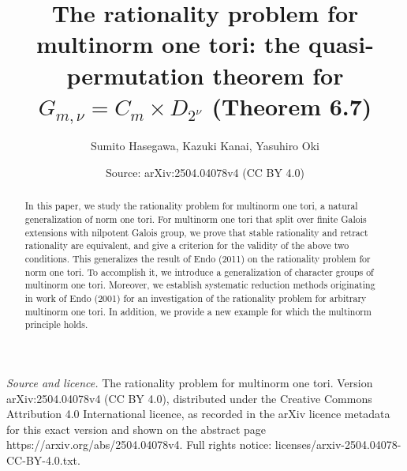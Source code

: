\documentclass[10pt,a4paper]{amsart}
\title[The quasi-permutation theorem for $G_{m,\nu}=C_{m}\times D_{2^{\nu}}$]{The rationality problem for multinorm one tori: the quasi-permutation theorem for $G_{m,\nu}=C_{m}\times D_{2^{\nu}}$ (Theorem 6.7)}
\author{Sumito Hasegawa, Kazuki Kanai, Yasuhiro Oki}
\date{Source: arXiv:2504.04078v4 (CC BY 4.0)}
\begin{document}
\begin{abstract}
In this paper, we study the rationality problem for multinorm one tori, a natural generalization of norm one tori. 
For multinorm one tori that split over finite Galois extensions with nilpotent Galois group, we prove that stable rationality and retract rationality are equivalent, and give a criterion for the validity of the above two conditions. 
This generalizes the result of Endo (2011) on the rationality problem for norm one tori. 
To accomplish it, 
we introduce a generalization of character groups of multinorm one tori.
Moreover, we establish systematic reduction methods originating in work of Endo (2001) for an investigation of the rationality problem for arbitrary multinorm one tori.
In addition, we provide a new example for which the multinorm principle holds.


\end{abstract}
\maketitle

\noindent\emph{Source and licence.} The rationality problem for multinorm one tori. Version arXiv:2504.04078v4 (CC BY 4.0), distributed under the Creative Commons Attribution 4.0 International licence, as recorded in the arXiv licence metadata for this exact version and shown on the abstract page https://arxiv.org/abs/2504.04078v4. Full rights notice: licenses/arxiv-2504.04078-CC-BY-4.0.txt.\par\smallskip
\end{document}

